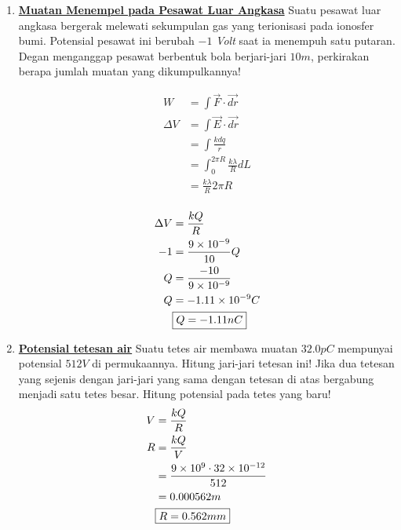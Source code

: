 \begin{enumerate}
    \item \underline{\textbf{Muatan Menempel pada Pesawat Luar Angkasa}}
    \vskip5pt
    Suatu pesawat luar angkasa bergerak melewati sekumpulan gas yang terionisasi pada ionosfer bumi. Potensial pesawat ini berubah $-1$ \textit{Volt} saat ia menempuh satu putaran. Degan menganggap pesawat berbentuk bola berjari-jari $10m$, perkirakan berapa jumlah muatan yang dikumpulkannya!
    \vskip8pt
    \begin{minipage}{0.4\textwidth}
    \begin{align*}
        W &= \int\vec{F}\cdot\vec{dr}\\
        \Delta V &= \int\vec{E}\cdot\vec{dr}\\
        &=  \int\frac{kdq}{r}\\
        &= \int_{0}^{2\pi R}\frac{k\lambda}{R}dL\\
        &=\frac{k\lambda}{R}2\pi R\\
    \end{align*}
    \end{minipage}
    \hfill
    \begin{minipage}{0.6\textwidth}
    \begin{align*}
        \Delta V &= \frac{kQ}{R}\\
        -1&=\frac{9\times10^{-9}}{10}Q\\
        Q &= \frac{-10}{9\times10^{-9}}\\
        Q &= -1.11\times10^{-9}C\\
        &\fbox{$Q =-1.11nC$}
    \end{align*}
    \end{minipage}
    \pagebreak
    \item \underline{\textbf{Potensial tetesan air}}
    \vskip5pt
    Suatu tetes air membawa muatan $32.0pC$ mempunyai potensial $512V$ di permukaannya. Hitung jari-jari tetesan ini! Jika dua tetesan yang sejenis dengan jari-jari yang sama dengan tetesan di atas bergabung menjadi satu tetes besar. Hitung potensial pada tetes yang baru!
    \begin{align*}
        V&=\frac{kQ}{R}\\
        R&=\frac{kQ}{V}\\
        &= \frac{9\times10^{9}\cdot32\times10^{-12}}{512}\\
        &=0.000562m\\
        &\fbox{$R=0.562mm$}
    \end{align*}


\end{enumerate}
